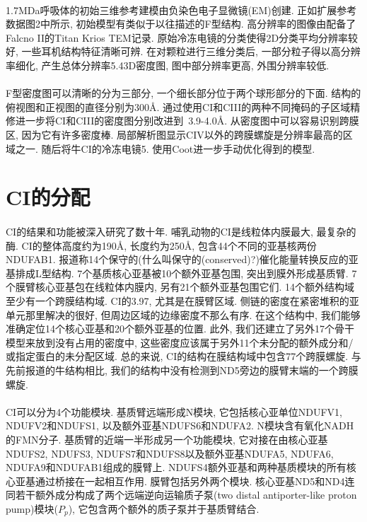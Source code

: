 \documentclass{article}
\begin{document}
  \paragraph{}
    1.7MDa呼吸体的初始三维参考建模由负染色电子显微镜(EM)创建. 正如扩展参考数据图2中所示, 初始模型有类似于以往描述的F型结构. 高分辨率的图像由配备了Falcno II的Titan Krios TEM记录. 原始冷冻电镜的分类使得2D分类平均分辨率较好, 一些耳机结构特征清晰可辨. 在对颗粒进行三维分类后, 一部分粒子得以高分辨率细化, 产生总体分辨率5.43D密度图, 图中部分辨率更高, 外围分辨率较低.
  \paragraph{}
    F型密度图可以清晰的分为三部分, 一个细长部分位于两个球形部分的下面. 结构的俯视图和正视图的直径分别为300\AA. 通过使用CI和CIII的两种不同掩码的子区域精修进一步将CI和CIII的密度图分别改进到~3.9-4.0\AA. 从密度图中可以容易识别跨膜区, 因为它有许多密度棒. 局部解析图显示CIV以外的跨膜螺旋是分辨率最高的区域之一. 随后将牛CI的冷冻电镜5. 使用Coot进一步手动优化得到的模型.

\section{CI的分配}
  \paragraph{}
    CI的结果和功能被深入研究了数十年. 哺乳动物的CI是线粒体内膜最大, 最复杂的酶. CI的整体高度约为190\AA, 长度约为250\AA, 包含44个不同的亚基核两份NDUFAB1. 报道称14个保守的(什么叫保守的(conserved)?)催化能量转换反应的亚基排成L型结构. 7个基质核心亚基被10个额外亚基包围, 突出到膜外形成基质臂. 7个膜臂核心亚基包在线粒体内膜内, 另有21个额外亚基包围它们. 14个额外结构域至少有一个跨膜结构域. CI的3.97, 尤其是在膜臂区域. 侧链的密度在紧密堆积的亚单元那里解决的很好, 但周边区域的边缘密度不那么有序. 在这个结构中, 我们能够准确定位14个核心亚基和20个额外亚基的位置. 此外, 我们还建立了另外17个骨干模型来放到没有占用的密度中, 这些密度应该属于另外11个未分配的额外成分和/或指定蛋白的未分配区域. 总的来说, CI的结构在膜结构域中包含77个跨膜螺旋. 与先前报道的牛结构相比, 我们的结构中没有检测到ND5旁边的膜臂末端的一个跨膜螺旋.
  \paragraph{}
    CI可以分为4个功能模块. 基质臂远端形成N模块, 它包括核心亚单位NDUFV1, NDUFV2和NDUFS1, 以及额外亚基NDUFS6和NDUFA2. N模块含有氧化NADH的FMN分子. 基质臂的近端一半形成另一个功能模块, 它对接在由核心亚基NDUFS2, NDUFS3, NDUFS7和NDUFS8以及额外亚基NDUFA5, NDUFA6, NDUFA9和NDUFAB1组成的膜臂上. NDUFS4额外亚基和两种基质模块的所有核心亚基通过桥接在一起相互作用. 膜臂包括另外两个模块. 核心亚基ND5和ND4连同若干额外成分构成了两个远端逆向运输质子泵(two distal antiporter-like proton pump)模块($P_p$), 它包含两个额外的质子泵并于基质臂结合.
\end{document}
